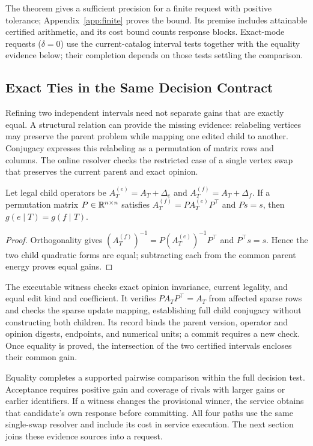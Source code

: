 The theorem gives a sufficient precision for a finite request with positive tolerance; Appendix~\ref{app:finite} proves the bound. Its premise includes attainable certified arithmetic, and its cost bound counts response blocks. Exact-mode requests ($\delta=0$) use the current-catalog interval tests together with the equality evidence below; their completion depends on those tests settling the comparison.

\subsection{Exact Ties in the Same Decision Contract}
Refining two independent intervals need not separate gains that are exactly equal. A structural relation can provide the missing evidence: relabeling vertices may preserve the parent problem while mapping one edited child to another. Conjugacy expresses this relabeling as a permutation of matrix rows and columns. The online resolver checks the restricted case of a single vertex swap that preserves the current parent and exact opinion.

\begin{proposition}\label{prop:equality}
Let legal child operators be $A_T^{(e)}=A_T+\Delta_e$ and $A_T^{(f)}=A_T+\Delta_f$. If a permutation matrix $P\in\mathbb R^{n\times n}$ satisfies $A_T^{(f)}=P A_T^{(e)}P^\top$ and $Ps=s$, then $g(e\mid T)=g(f\mid T)$.
\end{proposition}
\begin{proof}
Orthogonality gives $(A_T^{(f)})^{-1}=P(A_T^{(e)})^{-1}P^\top$ and $P^\top s=s$. Hence the two child quadratic forms are equal; subtracting each from the common parent energy proves equal gains.
\end{proof}

The executable witness checks exact opinion invariance, current legality, and equal edit kind and coefficient. It verifies $PA_TP^\top=A_T$ from affected sparse rows and checks the sparse update mapping, establishing full child conjugacy without constructing both children. Its record binds the parent version, operator and opinion digests, endpoints, and numerical units; a commit requires a new check. Once equality is proved, the intersection of the two certified intervals encloses their common gain.

Equality completes a supported pairwise comparison within the full decision test. Acceptance requires positive gain and coverage of rivals with larger gains or earlier identifiers. If a witness changes the provisional winner, the service obtains that candidate's own response before committing. All four paths use the same single-swap resolver and include its cost in service execution. The next section joins these evidence sources into a request.
